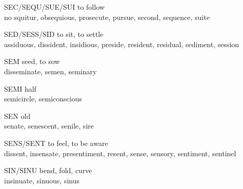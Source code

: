 \begin{flashcard}[Roots]{SEC/SEQU/SUE/SUI}
to follow\\
\vspace{0.2in}
no squitur, obsequious, prosecute, pursue, second, sequence, suite\\
\end{flashcard}

\begin{flashcard}[Roots]{SED/SESS/SID}
to sit, to settle\\
\vspace{0.2in}
assiduous, dissident, insidious, preside, resident, residual, sediment, session\\
\end{flashcard}

\begin{flashcard}[Roots]{SEM}
seed, to sow\\
\vspace{0.2in}
disseminate, semen, seminary\\
\end{flashcard}

\begin{flashcard}[Roots]{SEMI}
half\\
\vspace{0.2in}
semicircle, semiconscious\\
\end{flashcard}

\begin{flashcard}[Roots]{SEN}
old\\
\vspace{0.2in}
senate, senescent, senile, sire\\
\end{flashcard}

\begin{flashcard}[Roots]{SENS/SENT}
to feel, to be aware\\
\vspace{0.2in}
dissent, insensate, presentiment, resent, sense, sensory, sentiment, sentinel\\
\end{flashcard}

\begin{flashcard}[Roots]{SIN/SINU}
bend, fold, curve\\
\vspace{0.2in}
insinuate, sinuous, sinus\\
\end{flashcard}

